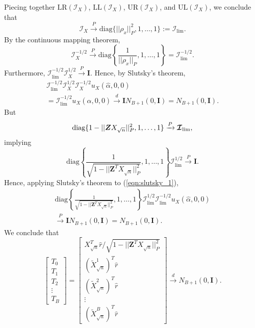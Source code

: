 \documentclass[12pt]{article}
\newcommand{\bs}[1]{\boldsymbol{#1}}
\newcommand{\infomat}{\bs{\mathcal{I}}}
\begin{document}
Piecing together $\textrm{LR}(\infomat_X)$, $\textrm{LL}(\infomat_X)$, $\textrm{UR}(\infomat_X)$, and $\textrm{UL}(\infomat_X)$, we conclude that
$$\infomat_X \xrightarrow{P} \textrm{diag}\{ ||\rho_x||^2_P, 1, \dots, 1\} := \infomat_\textrm{lim}.$$ By the continuous mapping theorem,
$$\infomat_X^{-1/2} \xrightarrow{P} \textrm{diag}\left\{ \frac{1}{||\rho_x||_P}, 1, \dots, 1\right\} = \infomat^{-1/2}_\textrm{lim}.$$
Furthermore, $\infomat_\textrm{lim}^{-1/2} \infomat^{1/2}_X \xrightarrow{P} \bs{I}.$
Hence, by Slutsky's theorem,
\begin{multline}\label{eqn:slutsky_1}
\infomat_\textrm{lim}^{-1/2} \infomat^{1/2}_X \infomat_X^{-1/2} u_X(\hat{\alpha}, 0, 0) \\ = \infomat_\textrm{lim}^{-1/2} u_X(\hat{\alpha}, 0, 0) \xrightarrow{d} \bs{I} N_{B+1}(0, \bs{I}) = N_{B+1}(0, \bs{I}).
\end{multline}
But
$$ \textrm{diag}\{1 - || \bs{Z} X_{\sqrt{n}} ||^2_P , 1, \dots, 1 \} \\ \xrightarrow{P} \infomat_\textrm{lim},$$ implying
$$\textrm{diag}\left\{\frac{1}{\sqrt{1 - || \bs{Z}^T X_{\sqrt{n}} ||^2_{P}}}, 1, \dots, 1 \right\} \infomat_\textrm{lim}^{1/2} \xrightarrow{P} \bs{I}.$$
Hence, applying Slutsky's theorem to (\ref{eqn:slutsky_1}),
\begin{multline*}
\textrm{diag}\left\{ \frac{1}{\sqrt{1 - || \bs{Z}^T X_{\sqrt{n}} ||^2_{P}}}, 1, \dots, 1 \right\} \infomat^{1/2}_\textrm{lim} \infomat_{\textrm{lim}}^{-1/2} u_X(\hat{\alpha}, 0, 0)  \\ \xrightarrow{P} \bs{I} N_{B+1}(0, \bs{I}) = N_{B+1}(0, \bs{I}).
\end{multline*}
We conclude that
$$ \begin{bmatrix} T_0 \\ T_1 \\ T_2 \\ \vdots \\ T_B \end{bmatrix} = \begin{bmatrix} X^T_{\sqrt{n}} \hat{r} / \sqrt{1 - ||\bs{Z}^T X_{\sqrt{n}}||^2_P} \\ \left(\tilde{X}^1_{\sqrt{n}} \right)^T \hat{r} \\ \left(\tilde{X}^2_{\sqrt{n}} \right)^T \hat{r} \\ \vdots \\ \left(\tilde{X}^B_{\sqrt{n}} \right)^T \hat{r} \end{bmatrix} \xrightarrow{d} N_{B+1}(0, \bs{I}).$$
\end{document}
